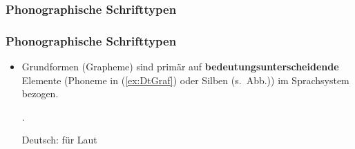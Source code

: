 \subsubsection{Phonographische Schrifttypen}

\begin{frame}
\frametitle{Phonographische Schrifttypen}

\begin{minipage}{.59\textwidth}

\begin{itemize}
	\item Grundformen (\zB Grapheme) sind primär auf \textbf{bedeutungsunterscheidende} Elemente (\zB Phoneme in (\ref{ex:DtGraf}) oder Silben (s.\ Abb.)) im Sprachsystem bezogen.
	
	 \citep[vgl.][76--77]{Duerscheid04a}.
	
	\ea\label{ex:DtGraf} Deutsch:  für Laut \textipa{[k]}
	\z 
\end{itemize}

\end{minipage}\hfill%
\begin{minipage}{.4\textwidth}
\begin{figure}
	\centering
	

\end{figure}
\end{minipage}
\end{frame}

